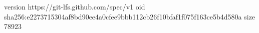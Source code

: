 version https://git-lfs.github.com/spec/v1
oid sha256:e2273715304af8bd90ee4a0cfee9bbb112cb26f10bfaf1f075f163ce5b4d580a
size 78923
